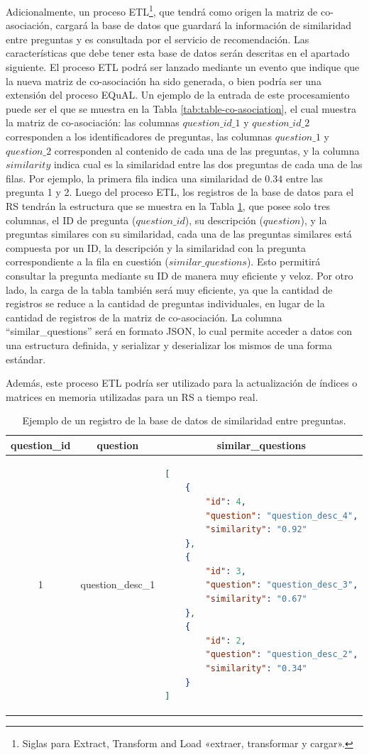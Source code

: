 Adicionalmente, un proceso ETL\footnote{Siglas para Extract, Transform and Load «extraer, transformar y cargar».}, que tendrá como origen la matriz de co-asociación, cargará la base de datos que guardará la información de similaridad entre preguntas y es consultada por el servicio de recomendación. Las características que debe tener esta base de datos serán descritas en el apartado siguiente. El proceso ETL podrá ser lanzado mediante un evento que indique que la nueva matriz de co-asociación ha sido generada, o bien podría ser una extensión del proceso EQuAL. Un ejemplo de la entrada de este procesamiento puede ser el que se muestra en la Tabla \ref{tab:table-co-asociation}, el cual muestra la matriz de co-asociación: las columnas \(question\_id\_1\) y \(question\_id\_2\) corresponden a los identificadores de preguntas, las columnas \(question\_1\) y \(question\_2\) corresponden al contenido de cada una de las preguntas, y la columna \(similarity\) indica cual es la similaridad entre las dos preguntas de cada una de las filas. Por ejemplo, la primera fila indica una similaridad de \(0.34\) entre las pregunta 1 y 2. Luego del proceso ETL, los registros de la base de datos para el RS tendrán la estructura que se muestra en la Tabla \ref{tab:table-similar-questions}, que posee solo tres columnas, el ID de pregunta (\(question\_id\)), su descripción (\(question\)), y la preguntas similares con su similaridad, cada una de las preguntas similares está compuesta por un ID, la descripción y la similaridad con la pregunta correspondiente a la fila en cuestión (\(similar\_questions\)). Esto permitirá consultar la pregunta mediante su ID de manera muy eficiente y veloz. Por otro lado, la carga de la tabla también será muy eficiente, ya que la cantidad de registros se reduce a la cantidad de preguntas individuales, en lugar de la cantidad de registros de la matriz de co-asociación. La columna “similar\_questions” será en formato JSON, lo cual permite acceder a datos con una estructura definida, y serializar y deserializar los mismos de una forma estándar.

\bigskip Además, este proceso ETL podría ser utilizado para la actualización de índices o matrices en memoria utilizadas para un RS a tiempo real.

\begin{table}[h!]
	\centering
	\footnotesize
	\caption{Ejemplo de un registro de la base de datos de similaridad entre preguntas.}
	\begin{tabular}{|c|c|l|}
		\hline
		\textbf{question\_id} &
		\textbf{question} &
		\multicolumn{1}{c|}{\textbf{similar\_questions}} \\ \hline
		1 & question\_desc\_1 & \begin{lstlisting}[language=json]
[
	{
		"id": 4,
		"question": "question_desc_4",
		"similarity": "0.92"
	},
	{
		"id": 3,
		"question": "question_desc_3",
		"similarity": "0.67"
	},
	{
		"id": 2,
		"question": "question_desc_2",
		"similarity": "0.34"
	}
]
		\end{lstlisting} \\ \hline
	\end{tabular}
	\label{tab:table-similar-questions}
\end{table}


